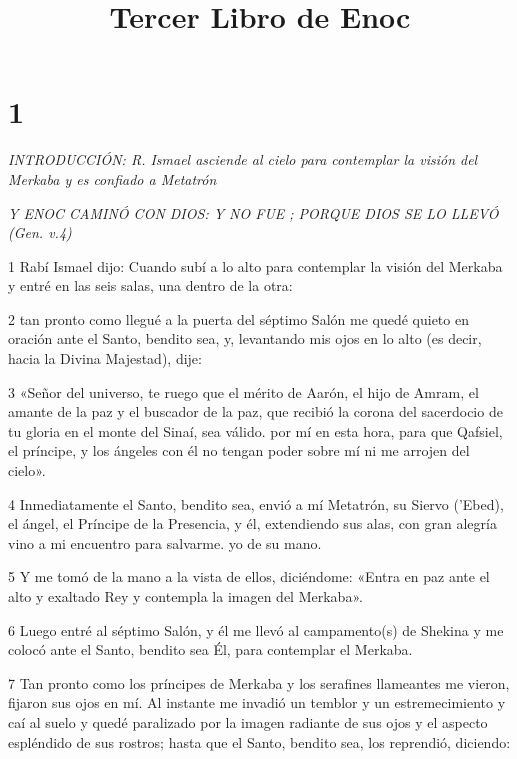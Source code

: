 

\title{Tercer Libro de Enoc}

\chapter{1}

\par \textit{INTRODUCCIÓN: R. Ismael asciende al cielo para contemplar la visión del Merkaba y es confiado a Metatrón}

\par \textit{Y ENOC CAMINÓ CON DIOS: Y NO FUE ; PORQUE DIOS SE LO LLEVÓ (Gen. v.4)}

\par 1 Rabí Ismael dijo: Cuando subí a lo alto para contemplar la visión del Merkaba y entré en las seis salas, una dentro de la otra:

\par 2 tan pronto como llegué a la puerta del séptimo Salón me quedé quieto en oración ante el Santo, bendito sea, y, levantando mis ojos en lo alto (es decir, hacia la Divina Majestad), dije:

\par 3 «Señor del universo, te ruego que el mérito de Aarón, el hijo de Amram, el amante de la paz y el buscador de la paz, que recibió la corona del sacerdocio de tu gloria en el monte del Sinaí, sea válido. por mí en esta hora, para que Qafsiel, el príncipe, y los ángeles con él no tengan poder sobre mí ni me arrojen del cielo».

\par 4 Inmediatamente el Santo, bendito sea, envió a mí Metatrón, su Siervo ('Ebed), el ángel, el Príncipe de la Presencia, y él, extendiendo sus alas, con gran alegría vino a mi encuentro para salvarme. yo de su mano.

\par 5 Y me tomó de la mano a la vista de ellos, diciéndome: «Entra en paz ante el alto y exaltado Rey y contempla la imagen del Merkaba».

\par 6 Luego entré al séptimo Salón, y él me llevó al campamento(s) de Shekina y me colocó ante el Santo, bendito sea Él, para contemplar el Merkaba.

\par 7 Tan pronto como los príncipes de Merkaba y los serafines llameantes me vieron, fijaron sus ojos en mí. Al instante me invadió un temblor y un estremecimiento y caí al suelo y quedé paralizado por la imagen radiante de sus ojos y el aspecto espléndido de sus rostros; hasta que el Santo, bendito sea, los reprendió, diciendo:

